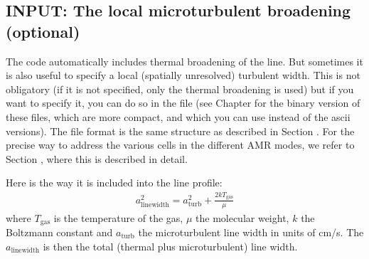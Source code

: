 \documentclass[letterpaper,10pt,english]{sphinxmanual}
\begin{document}
\subsection{INPUT: The local microturbulent broadening (optional)}
\label{\detokenize{lineradtrans:input-the-local-microturbulent-broadening-optional}}\label{\detokenize{lineradtrans:sec-turb-broadening}}
The  code automatically includes thermal broadening of the line. But
sometimes it is also useful to specify a local (spatially unresolved) turbulent
width. This is not obligatory (if it is not specified, only the thermal
broadening is used) but if you want to specify it, you can do so in the file
 (see Chapter {\hyperref[\detokenize{binaryio:chap-binary-io}]{}} for the binary
version of these files, which are more compact, and which you can use instead of
the ascii versions). The file format is the same structure as described in
Section {\hyperref[\detokenize{lineradtrans:sec-mol-numdensity}]{}}. For the precise way to address the various
cells in the different AMR modes, we refer to Section {\hyperref[\detokenize{inputoutputfiles:sec-dustdens}]{}}, where
this is described in detail.

Here is the way it is included into the line profile:
\begin{equation*}
\begin{split}a_{\mathrm{linewidth}}^2 = a^2_{\mathrm{turb}} + \frac{2kT_{\mathrm{gas}}}{\mu}\end{split}
\end{equation*}
where \(T_{\mathrm{gas}}\) is the temperature of the gas, \(\mu\) the
molecular weight, \(k\) the Boltzmann constant and \(a_{\mathrm{turb}}\)
the microturbulent line width in units of cm/s. The
\(a_{\mathrm{linewidth}}\) is then the total (thermal plus microturbulent)
line width.
\end{document}
